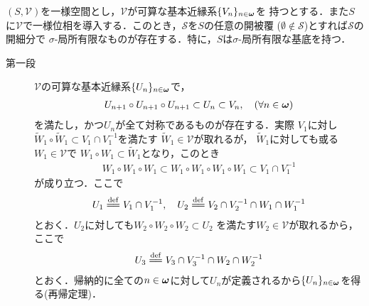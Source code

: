 	\begin{screen}
		\begin{thm}
		\label{thm:if_uniformity_has_countable_base_then_has_topology_has_sigma_locally_finite_base}
			$(S,\mathscr{V})$を一様空間とし，$\mathscr{V}$が可算な基本近縁系$\{V_n\}_{n \in {\boldsymbol \omega}}$を
			持つとする．また$S$に$\mathscr{V}$で一様位相を導入する．このとき，$\mathscr{S}$を$S$の任意の開被覆
			($\emptyset \notin \mathscr{S}$)とすれば$\mathscr{S}$の開細分で
			$\sigma$-局所有限なものが存在する．特に，$S$は$\sigma$-局所有限な基底を持つ．
		\end{thm}
	\end{screen}
	
	\begin{prf}\mbox{}
		\begin{description}
			\item[第一段] $\mathscr{V}$の可算な基本近縁系$\{U_n\}_{n \in {\boldsymbol \omega}}$で，
				\begin{align}
					U_{n+1} \circ U_{n+1} \circ U_{n+1} \subset U_n
					\subset V_n,\quad (\forall n \in {\boldsymbol \omega})
				\end{align}
				を満たし，かつ$U_n$が全て対称であるものが存在する．実際
				$V_1$に対し$\tilde{W}_1 \circ \tilde{W}_1 \subset V_1 \cap V_1^{-1}$を満たす
				$\tilde{W}_1 \in \mathscr{V}$が取れるが，
				$\tilde{W}_1$に対しても或る$W_1 \in \mathscr{V}$で
				$W_1 \circ W_1 \subset \tilde{W}_1$となり，このとき
				\begin{align}
					W_1 \circ W_1 \circ W_1
					\subset W_1 \circ W_1 \circ W_1 \circ W_1
					\subset V_1 \cap V_1^{-1}
				\end{align}
				が成り立つ．ここで
				\begin{align}
					U_1 \defeq V_1 \cap V_1^{-1},
					\quad U_2 \defeq V_2 \cap V_2^{-1} \cap W_1 \cap W_1^{-1}
				\end{align}
				とおく．$U_2$に対しても$W_2 \circ W_2 \circ W_2 \subset U_2$
				を満たす$W_2 \in \mathscr{V}$が取れるから，ここで
				\begin{align}
					U_3 \defeq V_3 \cap V_3^{-1} \cap W_2 \cap W_2^{-1}
				\end{align}
				とおく．帰納的に全ての$n \in {\boldsymbol \omega}$に対して$U_n$が定義されるから$\{U_n\}_{n \in {\boldsymbol \omega}}$を得る(再帰定理)．
				

\end{description}
\end{prf}
